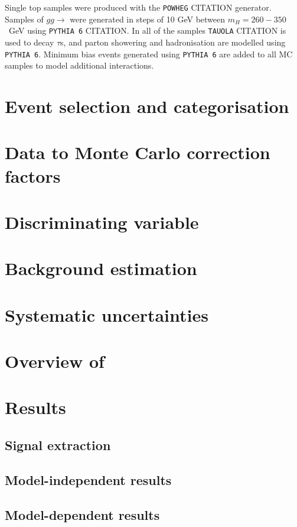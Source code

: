 Single top samples were produced with the \texttt{POWHEG} CITATION generator. Samples of $gg\rightarrow$\Htohhtobbtautau
were generated in steps of 10 GeV between $m_H = 260 - 350$~GeV using \texttt{PYTHIA 6} CITATION. In all of the samples
\texttt{TAUOLA} CITATION is used to decay $\tau$s, and parton showering and hadronisation are modelled using \texttt{PYTHIA 6}.
Minimum bias events generated using \texttt{PYTHIA 6} are added to all MC samples to model additional
interactions. 
\vfill

\section{Event selection and categorisation}
\label{sec:hhh_selection}

\section{Data to Monte Carlo correction factors}
\label{sec:hhh_datamc}

\section{Discriminating variable}
\label{sec:hhh_discr}

\section{Background estimation}
\label{sec:hhh_backgrounds}

\section{Systematic uncertainties}
\label{sec:hhh_uncs}

\section{\texorpdfstring{Overview of \AtoZhtolltautau}{Overview of A->Zh->lltautau}}
\label{sec:hhh_azh}

\section{Results}
\label{sec:hhh_results}

\subsection{Signal extraction}
\label{sec:hhh_results_extraction}

\subsection{Model-independent results}
\label{sec:hhh_results_modelindep}


\subsection{Model-dependent results}
\label{sec:hhh_results_modeldep}


